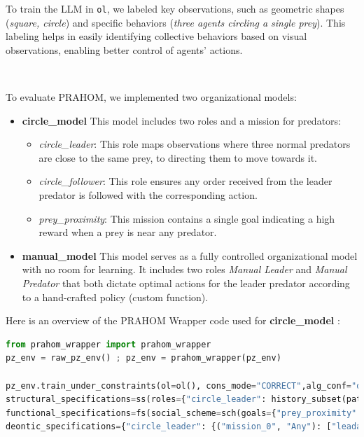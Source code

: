 \documentclass[runningheads]{llncs}
\theoremstyle{freethm}
\theoremstyle{proofoutline}
\newcounter{relation}
\begin{document}
\noindent To train the LLM in \texttt{ol}, we labeled key observations, such as geometric shapes (\textit{square, circle}) and specific behaviors (\textit{three agents circling a single prey}). This labeling helps in easily identifying collective behaviors based on visual observations, enabling better control of agents' actions.

\

\noindent To evaluate PRAHOM, we implemented two organizational models:

\begin{itemize}
    \item \textbf{circle\_model} \quad This model includes two roles and a mission for predators:
    \begin{itemize}
        \item \textit{circle\_leader}: This role maps observations where three normal predators are close to the same prey, to directing them to move towards it.
        \item \textit{circle\_follower}: This role ensures any order received from the leader predator is followed with the corresponding action.
        \item \textit{prey\_proximity}: This mission contains a single goal indicating a high reward when a prey is near any predator.
    \end{itemize}

    \item \textbf{manual\_model} \quad This model serves as a fully controlled organizational model with no room for learning. It includes two roles \textit{Manual Leader} and \textit{Manual Predator} that both dictate optimal actions for the leader predator according to a hand-crafted policy (custom function).
\end{itemize}

\noindent Here is an overview of the PRAHOM Wrapper code used for \textbf{circle\_model} :
%
\begin{lstlisting}[language=Python, basicstyle=\scriptsize]
from prahom_wrapper import prahom_wrapper
pz_env = raw_pz_env() ; pz_env = prahom_wrapper(pz_env)

pz_env.train_under_constraints(ol=ol(), cons_mode="CORRECT",alg_conf="default_MAPPO",osr=osr(
structural_specifications=ss(roles={"circle_leader": history_subset(pattern="[o0,a1](1,4),[o1,a2](1,2)"), "circle_follower": history_subset(pattern="[o8,a8](0,*)")},role_inheritance_relations=None, root_groups=None),
functional_specifications=fs(social_scheme=sch(goals={"prey_proximity": history_subset(pattern="[#Any](0,*),[obs_prey_proximity]")},missions=["prey_proximity"], goals_structure=None,mission_to_goals={"mission_0": ["prey_proximity"]},mission_to_agent_cardinality=None),social_preferences=None),
deontic_specifications={"circle_leader": {("mission_0", "Any"): ["leadadversary_0"]}, "circle_follower": {("mission_0", "Any"): ["adversary_0, adversary_1, adversary_2,"]}}))
\end{lstlisting}
\end{document}
